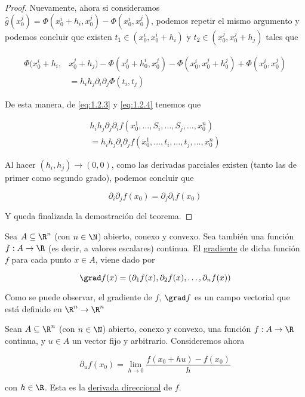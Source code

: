 \begin{proof}
    Nuevamente, ahora si consideramos $\hat{g}(x_0^j) = \Phi(x_0^i + h_i, x_0^j) - \Phi(x_0^i, x_0^j)$, podemos repetir el mismo argumento y podemos concluir que existen $t_1 \in (x_0^i, x_0^i + h_i)$ y $t_2 \in (x_0^j, x_0^j + h_j)$ tales que
    
    \begin{align}\label{eq:1.2.4}
        \Phi(x_0^i + h_i, &x_0^j + h_j) - \Phi(x_0^i + h_0^i, x_0^j) - \Phi(x_0^i, x_0^j + h_0^j) + \Phi(x_0^i, x_0^j) \nonumber \\
            &= h_ih_j \partial_i\partial_j \Phi(t_i, t_j)
    \end{align}
    
    De esta manera, de \ref{eq:1.2.3} y \ref{eq:1.2.4} tenemos que
    
    \begin{gather*}
        h_ih_j \partial_j\partial_i f(x_0^1, \dots, S_i, \dots, S_j, \dots, x_0^n) \\
        = h_ih_j \partial_i\partial_j f(x_0^1, \dots, t_i, \dots, t_j, \dots, x_0^n)
    \end{gather*}
    
    Al hacer $(h_i, h_j) \to (0, 0)$, como las derivadas parciales existen (tanto las de primer como segundo grado), podemos concluir que
    
    \[
    \partial_i\partial_j f(x_0) = \partial_j\partial_i f(x_0)
    \]
    
    Y queda finalizada la demostración del teorema.
\end{proof}

\begin{defn}
    Sea $A \subseteq \R^n$ (con $n \in \N$) abierto, conexo y convexo. Sea también una función $f: A \rightarrow \R$ (es decir, a valores escalares) continua. El \ul{gradiente} de dicha función $f$ para cada punto $x \in A$, viene dado por
    
    \[
    \grad f(x) = \left(\partial_1 f(x), \partial_2 f(x), \dots, \partial_n f(x)\right)
    \]
\end{defn}

Como se puede observar, el gradiente de $f$, $\grad f$ es un campo vectorial que está definido en $\R^n \rightarrow \R^n$

\begin{defn}
    Sean $A \subseteq \R^n$ (con $n \in \N$) abierto, conexo y convexo, una función $f: A \rightarrow \R$ continua, y $u \in A$ un vector fijo y arbitrario. Consideremos ahora
    
    \[
    \partial_u f(x_0) = \lim_{h \to 0} \frac{f(x_0 + hu) - f(x_0)}{h}
    \]
    
    \noindent con $h \in \R$. Esta es la \ul{derivada direccional} de $f$.
\end{defn}

